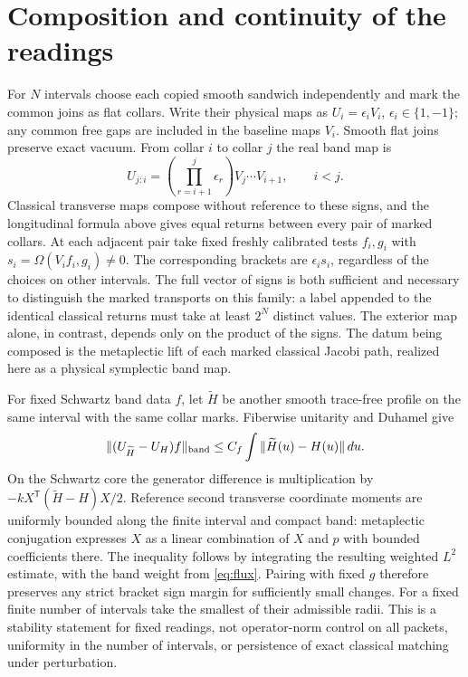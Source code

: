 \documentclass[11pt]{article}
\begin{document}
\section{Composition and continuity of the readings}
For $N$ intervals choose each copied smooth sandwich independently and mark the common joins as flat collars. Write their physical maps as $U_i=\epsilon_i V_i$, $\epsilon_i\in\{1,-1\}$; any common free gaps are included in the baseline maps $V_i$. Smooth flat joins preserve exact vacuum. From collar $i$ to collar $j$ the real band map is
\[
 U_{j:i}=\left(\prod_{r=i+1}^{j}\epsilon_r\right)V_j\cdots V_{i+1},
 \qquad i<j .
\]
Classical transverse maps compose without reference to these signs, and the longitudinal formula above gives equal returns between every pair of marked collars. At each adjacent pair take fixed freshly calibrated tests $f_i,g_i$ with $s_i=\Omega(V_i f_i,g_i)\ne0$. The corresponding brackets are $\epsilon_i s_i$, regardless of the choices on other intervals. The full vector of signs is both sufficient and necessary to distinguish the marked transports on this family: a label appended to the identical classical returns must take at least $2^N$ distinct values. The exterior map alone, in contrast, depends only on the product of the signs. The datum being composed is the metaplectic lift of each marked classical Jacobi path, realized here as a physical symplectic band map.

For fixed Schwartz band data $f$, let $\widetilde H$ be another smooth trace-free profile on the same interval with the same collar marks. Fiberwise unitarity and Duhamel give
\[
 \| (U_{\widetilde H}-U_H)f\|_{\rm band}
 \le C_f \int \|\widetilde H(u)-H(u)\|\,du .
\]
On the Schwartz core the generator difference is multiplication by
$-kX^\mathsf{T}(\widetilde H-H)X/2$. Reference second transverse coordinate moments are uniformly bounded along the finite interval and compact band: metaplectic conjugation expresses $X$ as a linear combination of $X$ and $p$ with bounded coefficients there. The inequality follows by integrating the resulting weighted $L^2$ estimate, with the band weight from \eqref{eq:flux}. Pairing with fixed $g$ therefore preserves any strict bracket sign margin for sufficiently small changes. For a fixed finite number of intervals take the smallest of their admissible radii. This is a stability statement for fixed readings, not operator-norm control on all packets, uniformity in the number of intervals, or persistence of exact classical matching under perturbation.
\end{document}
